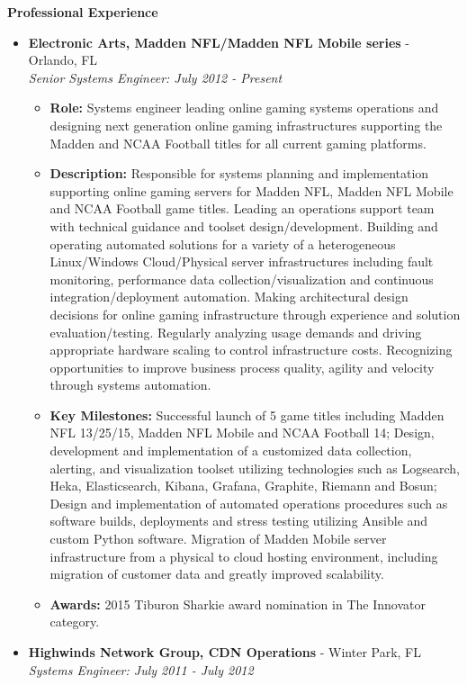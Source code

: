 \documentclass[10pt,oneside]{article}
\newenvironment{ressection}[1]{
  \vspace{4pt}
  \textbf{\selectfont\normalsize#1}
  \begin{itemize}
  \vspace{3pt}
}{
  \end{itemize}
}
\newcommand{\ressubitem}[1]{
  \vspace{-1pt}
  \item \begin{flushleft} #1 \end{flushleft}
}
\newcommand{\resbigitem}[3]{
  \vspace{-5pt}
  \item
  \textbf{#1} - #2 \\
  \textit{#3}
}
\newenvironment{ressubsec}[3]{
  \resbigitem{#1}{#2}{#3}
  \vspace{-2pt}
  \begin{itemize}
}{
  \end{itemize}
}
\begin{document}

\begin{ressection}{Professional Experience}

  \begin{ressubsec}{Electronic Arts, Madden NFL/Madden NFL Mobile series}{Orlando, FL}{Senior Systems Engineer: July 2012 - Present}

    \ressubitem{\textbf{Role:} Systems engineer leading online gaming systems operations and designing next generation online gaming infrastructures supporting the Madden and NCAA Football titles for all current gaming platforms.}

    \ressubitem{\textbf{Description:} Responsible for systems planning and implementation supporting online gaming servers for Madden NFL, Madden NFL Mobile and NCAA Football game titles. Leading an operations support team with technical guidance and toolset design/development. Building and operating automated solutions for a variety of a heterogeneous Linux/Windows Cloud/Physical server infrastructures including fault monitoring, performance data collection/visualization and continuous integration/deployment automation. Making architectural design decisions for online gaming infrastructure through experience and solution evaluation/testing. Regularly analyzing usage demands and driving appropriate hardware scaling to control infrastructure costs. Recognizing opportunities to improve business process quality, agility and velocity through systems automation.}

    \ressubitem{\textbf{Key Milestones:} Successful launch of 5 game titles including Madden NFL 13/25/15, Madden NFL Mobile and NCAA Football 14; Design, development and implementation of a customized data collection, alerting, and visualization toolset utilizing technologies such as Logsearch, Heka, Elasticsearch, Kibana, Grafana, Graphite, Riemann and Bosun; Design and implementation of automated operations procedures such as software builds, deployments and stress testing utilizing Ansible and custom Python software.  Migration of Madden Mobile server infrastructure from a physical to cloud hosting environment, including migration of customer data and greatly improved scalability.}

    \ressubitem{\textbf{Awards:} 2015 Tiburon Sharkie award nomination in The Innovator category.}

  \end{ressubsec}

  \begin{ressubsec}{Highwinds Network Group, CDN Operations}{Winter Park, FL}{Systems Engineer: July 2011 - July 2012}


\end{ressubsec}
\end{ressection}
\end{document}
